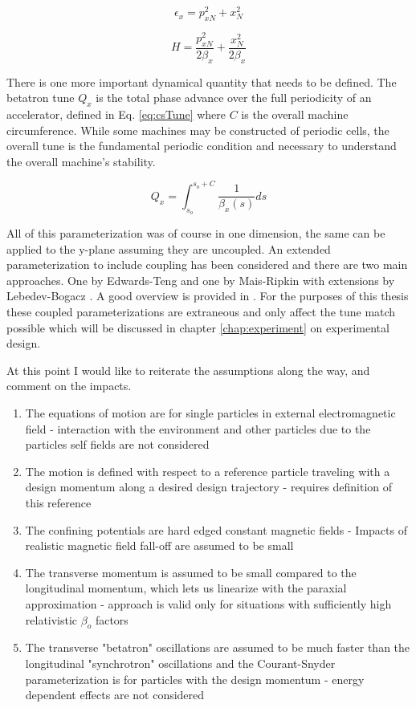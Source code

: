 \begin{equation} \label{eq:csNormEmit}
	\epsilon_x = p_{xN}^2 + x_{N}^2
\end{equation}

\begin{equation} \label{eq:csNormHam}
	H = \frac{p_{xN}^2}{2\beta_x} + \frac{x_{N}^2}{2\beta_x}
\end{equation}

There is one more important dynamical quantity that needs to be defined. The betatron tune $Q_x$ is the total phase advance over the full periodicity of an accelerator, defined in Eq. \ref{eq:csTune} where $C$ is the overall machine circumference. While some machines may be constructed of periodic cells, the overall tune is the fundamental periodic condition and necessary to understand the overall machine's stability.

\begin{equation} \label{eq:csTune}
	Q_x = \int_{s_o}^{s_o + C} \frac{1}{\beta_x(s)} ds
\end{equation}

All of this parameterization was of course in one dimension, the same can be applied to the y-plane assuming they are uncoupled. An extended parameterization to include coupling has been considered and there are two main approaches. One by Edwards-Teng \cite{edwards-teng} and one by Mais-Ripkin \cite{mais-ripkin} with extensions by Lebedev-Bogacz \cite{lebedev-bogacz}. A good overview is provided in \cite{vanwelde}. For the purposes of this thesis these coupled parameterizations are extraneous and only affect the tune match possible which will be discussed in chapter \ref{chap:experiment} on experimental design.

At this point I would like to reiterate the assumptions along the way, and comment on the impacts.
\begin{enumerate}
	\item The equations of motion are for single particles in external electromagnetic field - interaction with the environment and other particles due to the particles self fields are not considered
	\item The motion is defined with respect to a reference particle traveling with a design momentum along a desired design trajectory - requires definition of this reference
	\item The confining potentials are hard edged constant magnetic fields - Impacts of realistic magnetic field fall-off are assumed to be small
	\item The transverse momentum is assumed to be small compared to the longitudinal momentum, which lets us linearize with the paraxial approximation - approach is valid only for situations with sufficiently high relativistic $\beta_o$ factors
	\item The transverse "betatron" oscillations are assumed to be much faster than the longitudinal "synchrotron" oscillations and the Courant-Snyder parameterization is for particles with the design momentum - energy dependent effects are not considered
\end{enumerate}

